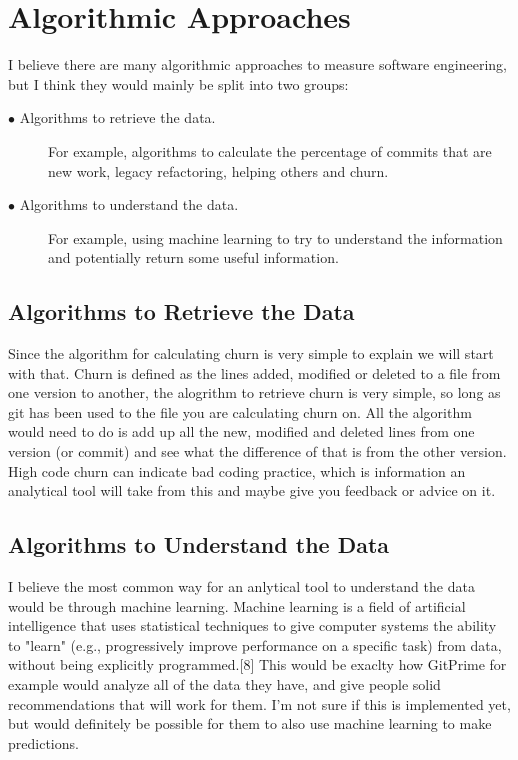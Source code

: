 \documentclass[12pt]{report}
\begin{document}
\section{Algorithmic Approaches}
I believe there are many algorithmic approaches to measure software engineering, but I think they would mainly be split into two groups:

\begin{description}
\item[$\bullet$ Algorithms to retrieve the data.] For example, algorithms to calculate the percentage of commits that are new work, legacy refactoring, helping others and churn. 

\item[$\bullet$ Algorithms to understand the data.] For example, using machine learning to try to understand the information and potentially return some useful information.
\end{description} 

\subsection{Algorithms to Retrieve the Data}
Since the algorithm for calculating churn is very simple to explain we will start with that. Churn is defined as the lines added, modified or deleted to a file from one version to another, the alogrithm to retrieve churn is very simple, so long as git has been used to the file you are calculating churn on. All the algorithm would need to do is add up all the new, modified and deleted lines from one version (or commit) and see what the difference of that is from the other version. High code churn can indicate bad coding practice, which is information an analytical tool will take from this and maybe give you feedback or advice on it. 


\subsection{Algorithms to Understand the Data} I believe the most common way for an anlytical tool to understand the data would be through machine learning. Machine learning  is a field of artificial intelligence that uses statistical techniques to give computer systems the ability to "learn" (e.g., progressively improve performance on a specific task) from data, without being explicitly programmed.[8] This would be exaclty how GitPrime for example would analyze all of the data they have, and give people solid recommendations that will work for them. I'm not sure if this is implemented yet, but would definitely be possible for them to also use machine learning to make predictions.
\end{document}
